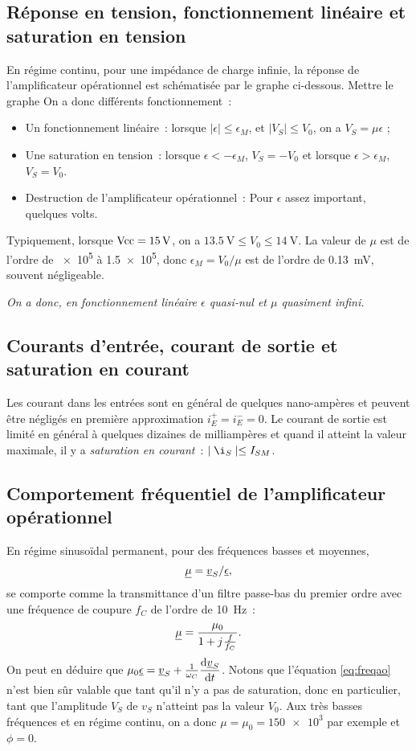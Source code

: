 \subsection{Réponse en tension, fonctionnement linéaire et saturation en 
tension}%
En régime continu, pour une impédance de charge infinie, la réponse de 
l'amplificateur opérationnel est schématisée par le graphe ci-dessous.%
Mettre le graphe
On a donc différents fonctionnement~:
\begin{itemize}%
  \item Un fonctionnement linéaire~: lorsque \(\mid \epsilon \mid \leq 
    \epsilon_M\), et \(\mid V_S \mid \leq V_0\), on a \(V_S = \mu \epsilon\) ;
  \item Une saturation en tension~: lorsque \(\epsilon < -\epsilon_M\), \(V_S = 
    -V_0\) et lorsque \(\epsilon > \epsilon_M\), \(V_S = V_0\).
  \item Destruction de l'amplificateur opérationnel~: Pour \(\epsilon\) assez 
    important, quelques volts.
\end{itemize}%
Typiquement, lorsque \(\textrm{Vcc} = \SI{15}{\volt}\), on a \(\SI{13.5}{\volt} \leq 
V_0 \leq \SI{14}{\volt}\). La valeur de \(\mu\) est de l'ordre de \num{e5} à 
\num{1.5e5}, donc \(\epsilon_M = V_0/\mu\) est de l'ordre de 
\SI{0.13}{\milli\volt}, souvent négligeable.

\emph{On a donc, en fonctionnement linéaire \(\epsilon\) quasi-nul et \(\mu\) 
quasiment infini.}%
\subsection{Courants d'entrée, courant de sortie et saturation en courant}%
Les courant dans les entrées sont en général de quelques nano-ampères et 
peuvent être négligés en première approximation \(i_E^+ = i_E^-=0\). Le courant 
de sortie est limité en général à quelques dizaines de milliampères et quand il 
atteint la valeur maximale, il y  a \emph{saturation en courant}~: \(\mid \i_S 
\mid \leq I_{SM}\).
\subsection{Comportement fréquentiel de l'amplificateur opérationnel}%
En régime sinusoïdal permanent, pour des fréquences basses et moyennes,
\begin{equation}%
  \label{eq:freqao}
  \ncomplexe{\mu} = \ncomplexe{v}_S / \ncomplexe{\epsilon},
\end{equation}%
se comporte comme la transmittance d'un filtre passe-bas du premier ordre avec 
une fréquence de coupure \(f_C\) de l'ordre de \SI{10}{\hertz}~:
\begin{equation}%
  \ncomplexe{\mu} = \frac{\mu_0}{1+\ju \frac{f}{f_C}}.
\end{equation}%
On peut en déduire que \( \mu_0 \underline{\epsilon} = \underline{v}_S + 
\frac{1}{\omega_C} \dfrac{\mathrm{d} \underline{v}_S}{\mathrm{d} t}\). Notons que l'équation 
\eqref{eq:freqao} n'est bien sûr valable que tant qu'il n'y a pas de 
saturation, donc en particulier, tant que l'amplitude \(V_S\) de \(v_S\) 
n'atteint pas la valeur \(V_0\). Aux très basses fréquences et en régime 
continu, on a donc \(\mu = \mu_0 = \num{150e3}\) par exemple et \(\phi=0\).

